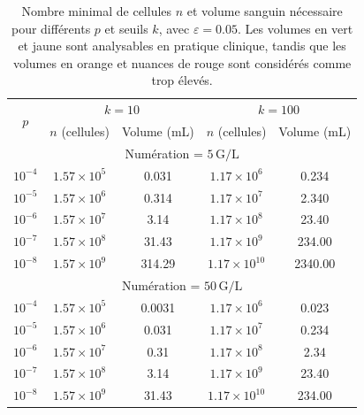 \begin{table}[H]
    \centering
    \caption{
        Nombre minimal de cellules $n$ et volume sanguin nécessaire pour différents $p$ et seuils $k$, avec $\varepsilon = 0.05$.
        Les volumes en \colorbox{mygreen}{vert} et \colorbox{myyellow}{jaune} sont analysables en pratique clinique, tandis que les 
        volumes en \colorbox{myorange}{orange} et nuances de \colorbox{myred}{rouge} sont considérés comme trop élevés.
    }
    \label{tab:valeurs_n_volume}
    \begin{tabular}{c|cc|cc}
        \toprule
        \multirow{2}{*}{$p$} & \multicolumn{2}{c|}{$k = 10$} & \multicolumn{2}{c}{$k = 100$} \\
        & $n$ (cellules) & Volume (mL) & $n$ (cellules) & Volume (mL) \\
        \midrule
        \multicolumn{5}{c}{Numération = $5\,\text{G/L}$} \\
        \midrule
        $10^{-4}$ & $1.57 \times 10^{5}$ & \cellcolor{mygreen}0.031 & $1.17 \times 10^{6}$ & \cellcolor{mygreen}0.234 \\
        $10^{-5}$ & $1.57 \times 10^{6}$ & \cellcolor{mygreen}0.314 & $1.17 \times 10^{7}$ & \cellcolor{myyellow}2.340 \\
        $10^{-6}$ & $1.57 \times 10^{7}$ & \cellcolor{myyellow}3.14 & $1.17 \times 10^{8}$ & \cellcolor{myorange}23.40 \\
        $10^{-7}$ & $1.57 \times 10^{8}$ & \cellcolor{myred}31.43 & $1.17 \times 10^{9}$ & \cellcolor{mydarkred}234.00 \\
        $10^{-8}$ & $1.57 \times 10^{9}$ & \cellcolor{mydarkred}314.29 & $1.17 \times 10^{10}$ & \cellcolor{mydeepred}2340.00 \\
        \midrule
        \multicolumn{5}{c}{Numération = $50\,\text{G/L}$} \\
        \midrule
        $10^{-4}$ & $1.57 \times 10^{5}$ & \cellcolor{mygreen}0.0031 & $1.17 \times 10^{6}$ & \cellcolor{mygreen}0.023 \\
        $10^{-5}$ & $1.57 \times 10^{6}$ & \cellcolor{mygreen}0.031 & $1.17 \times 10^{7}$ & \cellcolor{mygreen}0.234 \\
        $10^{-6}$ & $1.57 \times 10^{7}$ & \cellcolor{mygreen}0.31 & $1.17 \times 10^{8}$ & \cellcolor{myyellow}2.34 \\
        $10^{-7}$ & $1.57 \times 10^{8}$ & \cellcolor{myyellow}3.14 & $1.17 \times 10^{9}$ & \cellcolor{myorange}23.40 \\
        $10^{-8}$ & $1.57 \times 10^{9}$ & \cellcolor{myred}31.43 & $1.17 \times 10^{10}$ & \cellcolor{mydarkred}234.00 \\
        \bottomrule
    \end{tabular}
\end{table}

